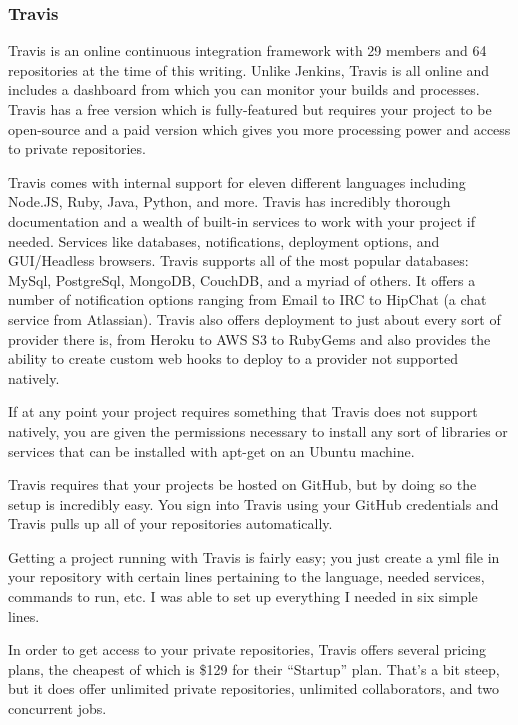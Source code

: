 \documentclass[11pt]{article}
\begin{document}
\subsubsection{Travis \cite{Travis}}
Travis is an online continuous integration framework with 29 members and 64 repositories at the time of this writing. Unlike Jenkins, Travis is all online and includes a dashboard from which you can monitor your builds and processes. Travis has a free version which is fully-featured but requires your project to be open-source and a paid version which gives you more processing power and access to private repositories.

Travis comes with internal support for eleven different languages including Node.JS, Ruby, Java, Python, and more. Travis has incredibly thorough documentation and a wealth of built-in services to work with your project if needed. Services like databases, notifications, deployment options, and GUI/Headless browsers. Travis supports all of the most popular databases: MySql, PostgreSql, MongoDB, CouchDB, and a myriad of others. It offers a number of notification options ranging from Email to IRC to HipChat (a chat service from Atlassian). Travis also offers deployment to just about every sort of provider there is, from Heroku to AWS S3 to RubyGems and also provides the ability to create custom web hooks to deploy to a provider not supported natively.

If at any point your project requires something that Travis does not support natively, you are given the permissions necessary to install any sort of libraries or services that can be installed with apt-get on an Ubuntu machine.

Travis requires that your projects be hosted on GitHub, but by doing so the setup is incredibly easy. You sign into Travis using your GitHub credentials and Travis pulls up all of your repositories automatically. 

Getting a project running with Travis is fairly easy; you just create a yml file in your repository with certain lines pertaining to the language, needed services, commands to run, etc. I was able to set up everything I needed in six simple lines.

In order to get access to your private repositories, Travis offers several pricing plans, the cheapest of which is \$129 \cite{TravisPricing} for their ``Startup'' plan. That's a bit steep, but it does offer unlimited private repositories, unlimited collaborators, and two concurrent jobs. 
\end{document}
